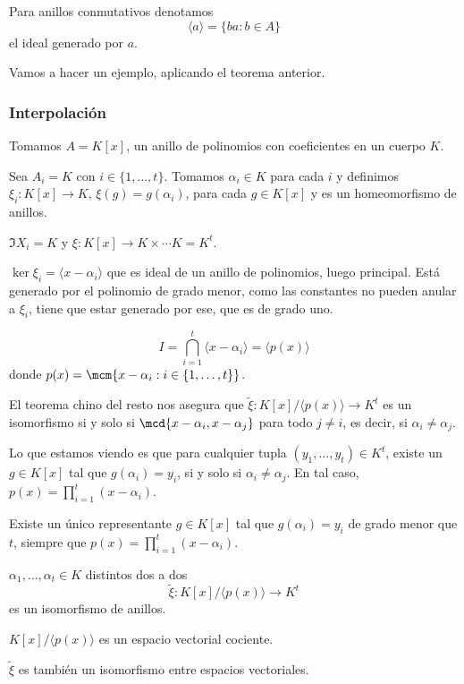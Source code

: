
\begin{obs}
  Para anillos conmutativos denotamos
  \[
    \langle a\rangle=\{ba:b\in A\}
  \]
  el ideal generado por \(a\).
\end{obs}

Vamos a hacer un ejemplo, aplicando el teorema anterior.

\subsubsection{Interpolación}         

Tomamos \(A=K[x]\), un anillo de polinomios con coeficientes en un
cuerpo \(K\).

Sea \(A_i = K\) con \(i\in\{1,\ldots,t\}\).
Tomamos \(\alpha_i\in K\) para cada \(i\) y definimos
\(\xi_i:K[x]\longrightarrow K\), \(\xi(g)=g(\alpha_i)\),
para cada \(g\in K[x]\) y es un homeomorfismo de anillos.

\(\Im X_i=K\) y \(\xi:K[x]\longrightarrow K\times
\cdots K=K^t\).

\(\ker \xi_i=\langle x-\alpha_i\rangle\) que es ideal de un anillo de
polinomios, luego principal. Está generado por el polinomio de grado menor,
como las constantes no pueden anular a \(\xi_i\), tiene que estar generado
por ese, que es de grado uno.

\[
  I=\bigcap_{i=1}^t\langle x-\alpha_i\rangle =\langle p(x)\rangle
\]
donde \(p(x)=\mcm\{x-\alpha_i: i\in\{1,\ldots, t\}\}\).


El teorema chino del resto nos asegura que \(\tilde{\xi}:
K[x]/\langle p(x)\rangle\longrightarrow K^t\) es un isomorfismo si y solo si
\(\mcd\{x-\alpha_i, x-\alpha_j\}\) para todo \(j\neq i\), es decir,
si \(\alpha_i\neq \alpha_j\).

Lo que estamos viendo es que para cualquier tupla
\((y_1,\ldots, y_t)\in K^t\), existe un \(g\in K[x]\) tal que
\(g(\alpha_i)=y_i\), si y solo si \(\alpha_i\neq\alpha_j\). En tal
caso, \(p(x)=\prod_{i=1}^t(x-\alpha_i)\).

Existe un único representante \(g\in K[x]\) tal que \(g(\alpha_i)=y_i\)
de grado menor que \(t\), siempre que
\(p(x)=\prod_{i=1}^t(x-\alpha_i)\).

\(\alpha_1,\ldots,\alpha_t\in K\) distintos dos a dos
\[
  \tilde{\xi}:K[x]/\langle p(x)\rangle\longrightarrow K^t
\]
es un isomorfismo de anillos.

\(K[x]/\langle p(x)\rangle\) es un espacio vectorial cociente.

\(\tilde{\xi}\) es también un isomorfismo entre espacios vectoriales.

